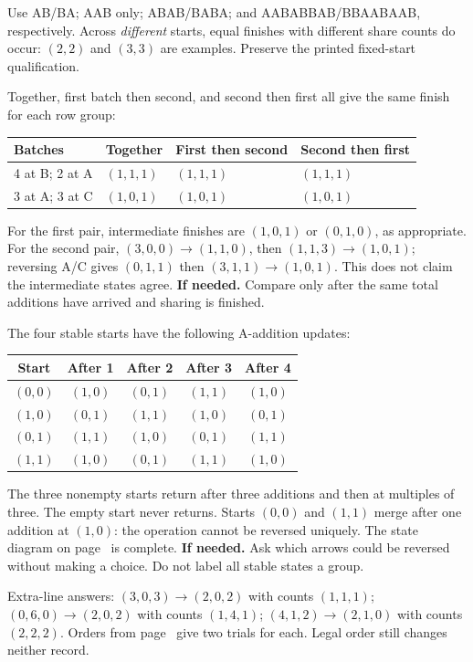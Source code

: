 \documentclass[11pt,letterpaper]{article}
\newcommand{\prob}[2]{\par\vspace{5pt}{\large\bfseries #1}\par #2}
\newcommand{\hint}[1]{\textbf{If needed.} #1\par}
\begin{document}
Use AB/BA; AAB only; ABAB/BABA; and AABABBAB/BBAABAAB, respectively. Across \emph{different} starts, equal finishes with different share counts do occur: $(2,2)$ and $(3,3)$ are examples. Preserve the printed fixed-start qualification.
\prob{Problem 2}{Together, first batch then second, and second then first all give the same finish for each row group:}
\begin{center}\begin{tabular}{llll}\toprule
Batches & Together & First then second & Second then first\\\midrule
4 at B; 2 at A&$(1,1,1)$&$(1,1,1)$&$(1,1,1)$\\
3 at A; 3 at C&$(1,0,1)$&$(1,0,1)$&$(1,0,1)$\\\bottomrule\end{tabular}\end{center}
For the first pair, intermediate finishes are $(1,0,1)$ or $(0,1,0)$, as appropriate. For the second pair, $(3,0,0)\to(1,1,0)$, then $(1,1,3)\to(1,0,1)$; reversing A/C gives $(0,1,1)$ then $(3,1,1)\to(1,0,1)$. This does not claim the intermediate states agree.
\hint{Compare only after the same total additions have arrived and sharing is finished.}
\prob{Problem 3}{The four stable starts have the following A-addition updates:}
\begin{center}\begin{tabular}{ccccc}\toprule
Start&After 1&After 2&After 3&After 4\\\midrule
$(0,0)$&$(1,0)$&$(0,1)$&$(1,1)$&$(1,0)$\\
$(1,0)$&$(0,1)$&$(1,1)$&$(1,0)$&$(0,1)$\\
$(0,1)$&$(1,1)$&$(1,0)$&$(0,1)$&$(1,1)$\\
$(1,1)$&$(1,0)$&$(0,1)$&$(1,1)$&$(1,0)$\\\bottomrule\end{tabular}\end{center}
The three nonempty starts return after three additions and then at multiples of three. The empty start never returns. Starts $(0,0)$ and $(1,1)$ merge after one addition at $(1,0)$: the operation cannot be reversed uniquely. The state diagram on page~\pageref{kcycle} is complete.
\hint{Ask which arrows could be reversed without making a choice. Do not label all stable states a group.}
\prob{Problem 4}{Extra-line answers: $(3,0,3)\to(2,0,2)$ with counts $(1,1,1)$; $(0,6,0)\to(2,0,2)$ with counts $(1,4,1)$; $(4,1,2)\to(2,1,0)$ with counts $(2,2,2)$. Orders from page~\pageref{middleextra} give two trials for each. Legal order still changes neither record.}
\end{document}
